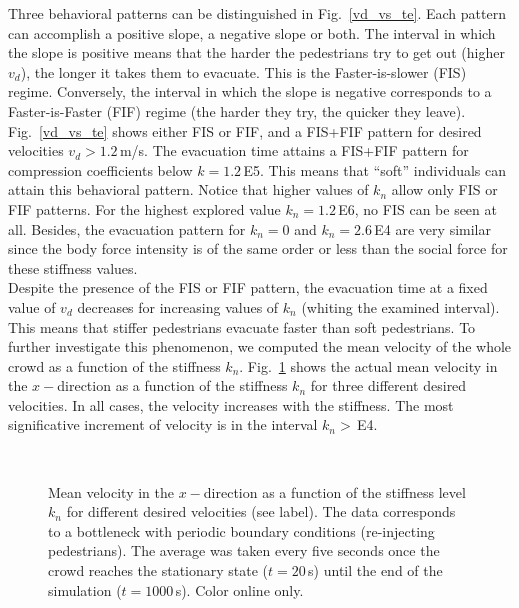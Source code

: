 \documentclass[preprint,12pt]{elsarticle}
\begin{document}
Three behavioral patterns can be distinguished in Fig.~\ref{vd_vs_te}. 
Each pattern can accomplish a positive slope, a negative slope
or both. The interval in which the slope is positive means that the 
harder the pedestrians try to get out (higher $v_d$), the 
longer it takes them to evacuate. This is the Faster-is-slower 
(FIS) regime. Conversely, the interval in which the slope is 
negative  corresponds to a Faster-is-Faster (FIF) regime (the 
harder they try, the quicker they leave).\\

Fig.~\ref{vd_vs_te}  shows either FIS or FIF, and a FIS+FIF pattern
for desired velocities $v_d>1.2\,$m/s. The 
evacuation time attains a FIS+FIF pattern for compression coefficients below 
$k=1.2\,$E5. This means that ``soft'' individuals can attain this 
behavioral pattern.  Notice that higher values of $k_n$ allow 
only FIS or FIF patterns. For the highest explored value $k_n=1.2\,$E6, no 
FIS can be seen at all. Besides, the evacuation pattern for $k_n = 0$ and $k_n 
= 2.6\,$E4 are very similar since the body force intensity is of the same order
or less than the social 
force for these stiffness values. \\

Despite the presence of the FIS or FIF pattern, the evacuation time at a 
fixed value of $v_d$ decreases for increasing values of $k_n$ (whiting the examined interval). 
This means that stiffer pedestrians evacuate faster than soft pedestrians. 
To further investigate this 
phenomenon, we computed the mean velocity of the whole crowd as a function of the 
stiffness $k_n$. Fig.~\ref{kn_vs_vx_bottleneck} shows the actual mean velocity in the 
$x-$direction as a function of the stiffness $k_n$ for three different desired 
velocities. In all cases, the velocity increases with the stiffness. The most significative 
increment of velocity is in the interval $k_n>\,$E4. \\


\begin{figure}[!htbp]
\centering
    \\
\caption[width=0.47\columnwidth]{Mean velocity in the $x-$direction as a function 
of the stiffness level $k_n$ for different desired velocities (see label). The 
data corresponds to a bottleneck with periodic boundary conditions (re-injecting 
pedestrians). The average was taken every five seconds once the crowd reaches the 
stationary state ($t=20\,$s) until the end of the simulation ($t=1000\,$s). 
Color online only. }
\label{kn_vs_vx_bottleneck}
\end{figure}
\end{document}
